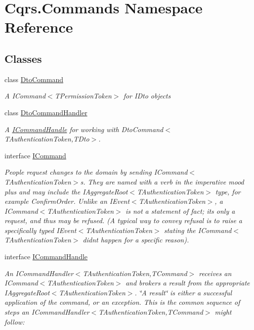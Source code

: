 \hypertarget{namespaceCqrs_1_1Commands}{}\section{Cqrs.\+Commands Namespace Reference}
\label{namespaceCqrs_1_1Commands}
\subsection*{Classes}
\begin{DoxyCompactItemize}
\item 
class \hyperlink{classCqrs_1_1Commands_1_1DtoCommand}{Dto\+Command}
\begin{DoxyCompactList}\small\item\em A I\+Command$<$\+T\+Permission\+Token$>$ for I\+Dto objects \end{DoxyCompactList}\item 
class \hyperlink{classCqrs_1_1Commands_1_1DtoCommandHandler}{Dto\+Command\+Handler}
\begin{DoxyCompactList}\small\item\em A \hyperlink{interfaceCqrs_1_1Commands_1_1ICommandHandle}{I\+Command\+Handle} for working with Dto\+Command$<$\+T\+Authentication\+Token,\+T\+Dto$>$. \end{DoxyCompactList}\item 
interface \hyperlink{interfaceCqrs_1_1Commands_1_1ICommand}{I\+Command}
\begin{DoxyCompactList}\small\item\em People request changes to the domain by sending I\+Command$<$\+T\+Authentication\+Token$>$s. They are named with a verb in the imperative mood plus and may include the I\+Aggregate\+Root$<$\+T\+Authentication\+Token$>$ type, for example Confirm\+Order. Unlike an I\+Event$<$\+T\+Authentication\+Token$>$, a I\+Command$<$\+T\+Authentication\+Token$>$ is not a statement of fact; it\textquotesingle{}s only a request, and thus may be refused. (A typical way to convey refusal is to raise a specifically typed I\+Event$<$\+T\+Authentication\+Token$>$ stating the I\+Command$<$\+T\+Authentication\+Token$>$ didn\textquotesingle{}t happen for a specific reason). \end{DoxyCompactList}\item 
interface \hyperlink{interfaceCqrs_1_1Commands_1_1ICommandHandle}{I\+Command\+Handle}
\begin{DoxyCompactList}\small\item\em An I\+Command\+Handler$<$\+T\+Authentication\+Token,\+T\+Command$>$ receives an I\+Command$<$\+T\+Authentication\+Token$>$ and brokers a result from the appropriate I\+Aggregate\+Root$<$\+T\+Authentication\+Token$>$. \char`\"{}\+A result\char`\"{} is either a successful application of the command, or an exception. This is the common sequence of steps an I\+Command\+Handler$<$\+T\+Authentication\+Token,\+T\+Command$>$ might follow\+: \end{DoxyCompactList}\item 

\end{DoxyCompactItemize}
